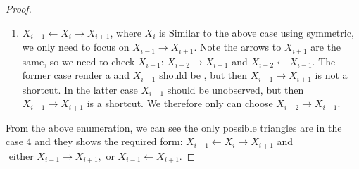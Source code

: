 \documentclass{article}
\begin{document}
\begin{proof}
\begin{enumerate}
    \item $X_{i-1} \leftarrow X_{i} \rightarrow X_{i+1}$, where $X_{i}$ is  Similar to the above case using symmetric, we only need to focus on $X_{i-1}\rightarrow X_{i+1}$. Note the arrows to $X_{i+1}$ are the same, so we need to check $X_{i-1}$: $X_{i-2}\rightarrow X_{i-1}$ and $X_{i-2}\leftarrow X_{i-1}$. The former case render a  and $X_{i-1}$ should be , but then $X_{i-1}\rightarrow X_{i+1}$ is not a shortcut. In the latter case $X_{i-1}$ should be unobserved, but then  $X_{i-1}\rightarrow X_{i+1}$ is a shortcut. We therefore only can choose $X_{i-2}\rightarrow X_{i-1}$.
\end{enumerate}
From the above enumeration, we can see the only possible triangles are in the case 4 and they shows the required form:  $X_{i-1} \leftarrow X_{i} \rightarrow X_{i+1}$ and $\text { either } X_{i-1} \rightarrow X_{i+1}, \text { or } X_{i-1} \leftarrow X_{i+1}$.


\end{proof}
\end{document}
